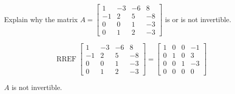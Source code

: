 
\begin{exerciseStatement}


Explain why the matrix \(A= \left[\begin{array}{cccc}
1 & -3 & -6 & 8 \\
-1 & 2 & 5 & -8 \\
0 & 0 & 1 & -3 \\
0 & 1 & 2 & -3
\end{array}\right] \) is or is not invertible.


\end{exerciseStatement}
    
\begin{exerciseAnswer} 


\[\operatorname{RREF} \left[\begin{array}{cccc}
1 & -3 & -6 & 8 \\
-1 & 2 & 5 & -8 \\
0 & 0 & 1 & -3 \\
0 & 1 & 2 & -3
\end{array}\right] = \left[\begin{array}{cccc}
1 & 0 & 0 & -1 \\
0 & 1 & 0 & 3 \\
0 & 0 & 1 & -3 \\
0 & 0 & 0 & 0
\end{array}\right] \]

\(A\) is not invertible.
\end{exerciseAnswer}
    
